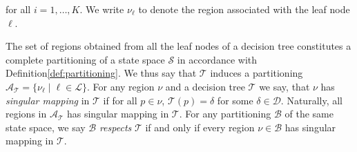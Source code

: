 \noindent
for all $i = 1,\ldots,K$. We write $\nu_{\ell}$ to denote the region associated
with the leaf node $\ell$.

The set of regions obtained from all the leaf nodes of a decision tree
constitutes a complete partitioning of a state space $\mathcal{S}$ in accordance
with Definition\ref{def:partitioning}. We thus say that $\mathcal{T}$ induces a partitioning
$\mathcal{A}_{\mathcal{T}} = \{ \nu_{\ell} \mid \ell \in \mathcal{L} \}$. For
any region $\nu$ and a decision tree $\mathcal{T}$ we say, that $\nu$ has
\textit{singular mapping} in $\mathcal{T}$ if for all $p \in \nu$,
$\mathcal{T}(p) = \delta$ for some $\delta \in \mathcal{D}$. Naturally, all
regions in $\mathcal{A}_{\mathcal{T}}$ has singular mapping in $\mathcal{T}$.
For any partitioning $\mathcal{B}$ of the same state space, we say $\mathcal{B}$
\textit{respects} $\mathcal{T}$ if and only if every region $\nu \in
\mathcal{B}$ has singular mapping in $\mathcal{T}$.

